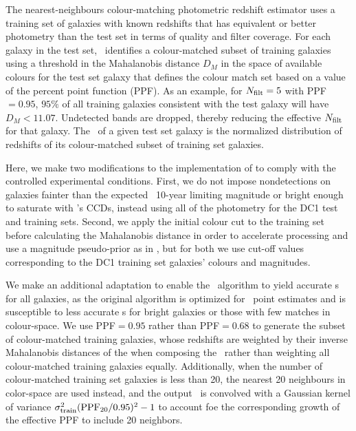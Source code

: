 The nearest-neighbours colour-matching photometric redshift estimator \citep[\cmnn,][]{Graham:17} uses a training set of galaxies with known redshifts that has equivalent or better photometry than the test set in terms of quality and filter coverage.
For each galaxy in the test set, \cmnn\ identifies a colour-matched subset of training galaxies using a threshold in the Mahalanobis distance $D_M$ in the space of available colours for the test set galaxy
that defines the colour match set based on a value of the percent point function (PPF).
As an example, for $N_{\rm{filt}}=5$ with PPF$=0.95$, $95\%$ of all training galaxies consistent with the test galaxy will have $D_M < 11.07$.
Undetected bands are dropped, thereby reducing the effective $N_{\rm{filt}}$ for that galaxy.
The \pzpdf\ of a given test set galaxy is the normalized distribution of redshifts of its colour-matched subset of training set galaxies.

Here, we make two modifications to the implementation of \citet{Graham:17} to comply with the controlled experimental conditions.
First, we do not impose nondetections on galaxies fainter than the expected \lsst\ 10-year limiting magnitude or bright enough to saturate with \lsst's CCDs, instead using all of the photometry for the DC1 test and training sets.
Second, we apply the initial colour cut to the training set before calculating the Mahalanobis distance in order to accelerate processing and use a magnitude pseudo-prior as in \citet{Graham:17}, but for both we use cut-off values corresponding to the DC1 training set galaxies' colours and magnitudes.

We make an additional adaptation to enable the \cmnn\ algorithm to yield accurate \pzpdf s for all galaxies, as the original \citet{Graham:17} algorithm is optimized for \pz\ point estimates and is susceptible to less accurate \pzpdf s for bright galaxies or those with few matches in colour-space.
We use PPF$=0.95$ rather than PPF$=0.68$ to generate the subset of colour-matched training galaxies, whose redshifts are weighted by their inverse Mahalanobis distances of the when composing the \pzpdf\ rather than weighting all colour-matched training galaxies equally.
Additionally, when the number of colour-matched training set galaxies is less than 20, the nearest 20 neighbours in color-space are used instead, and the output \pzpdf\ is convolved with a Gaussian kernel of variance $\sigma_{\rm train}^{2}({\rm PPF}_{20}/0.95)^2 -1$ to account foe the corresponding growth of the effective PPF to include 20 neighbors.

